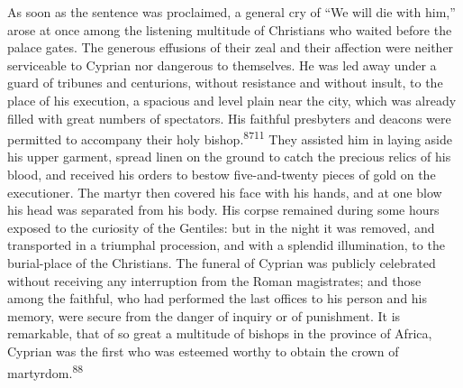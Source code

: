 

As soon as the sentence was proclaimed, a general cry of “We will
die with him,” arose at once among the listening multitude of
Christians who waited before the palace gates. The generous
effusions of their zeal and their affection were neither
serviceable to Cyprian nor dangerous to themselves. He was led
away under a guard of tribunes and centurions, without resistance
and without insult, to the place of his execution, a spacious and
level plain near the city, which was already filled with great
numbers of spectators. His faithful presbyters and deacons were
permitted to accompany their holy bishop.\textsuperscript{8711} They assisted him
in laying aside his upper garment, spread linen on the ground to
catch the precious relics of his blood, and received his orders
to bestow five-and-twenty pieces of gold on the executioner. The
martyr then covered his face with his hands, and at one blow his
head was separated from his body. His corpse remained during some
hours exposed to the curiosity of the Gentiles: but in the night
it was removed, and transported in a triumphal procession, and
with a splendid illumination, to the burial-place of the
Christians. The funeral of Cyprian was publicly celebrated
without receiving any interruption from the Roman magistrates;
and those among the faithful, who had performed the last offices
to his person and his memory, were secure from the danger of
inquiry or of punishment. It is remarkable, that of so great a
multitude of bishops in the province of Africa, Cyprian was the
first who was esteemed worthy to obtain the crown of martyrdom.\textsuperscript{88}


